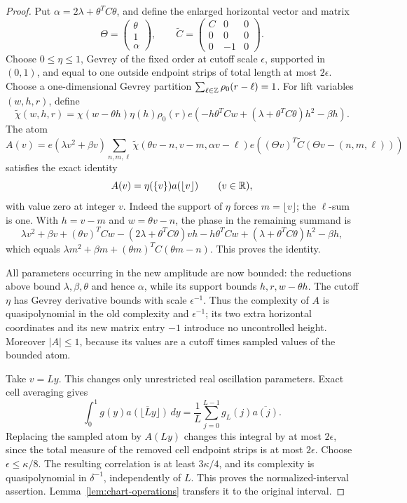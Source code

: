 \begin{proof}
Put \(\alpha=2\lambda+\theta^TC\theta\), and define the enlarged
horizontal vector and matrix
\[
 \Theta=\begin{pmatrix}\theta\\1\\\alpha\end{pmatrix},
 \qquad
 \widetilde C=
 \begin{pmatrix}
 C&0&0\\
 0&0&0\\
 0&-1&0
 \end{pmatrix}.
\]
Choose \(0\le\eta\le1\), Gevrey of the fixed order at cutoff scale
\(\epsilon\), supported in \((0,1)\), and equal to one outside
endpoint strips of total length at most \(2\epsilon\).
Choose a one-dimensional Gevrey partition
\(\sum_{\ell\in\mathbb Z}\rho_0(r-\ell)=1\).
For lift variables \((w,h,r)\), define
\[
 \widetilde\chi(w,h,r)=
   \chi(w-\theta h)\eta(h)\rho_0(r)
   e\!\left(-h\theta^TCw
             +(\lambda+\theta^TC\theta)h^2-\beta h\right).
\]
The atom
\[
 A(v)=e(\lambda v^2+\beta v)
       \sum_{n,m,\ell}
       \widetilde\chi(\theta v-n,v-m,\alpha v-\ell)
       e\!\left((\Theta v)^T\widetilde C
                        (\Theta v-(n,m,\ell))\right)
\]
satisfies the exact identity
\[
 A(v)=\eta(\{v\})a(\lfloor v\rfloor)
 \qquad(v\in\mathbb R),
\]
with value zero at integer \(v\).
Indeed the support of \(\eta\) forces \(m=\lfloor v\rfloor\);
the \(\ell\)-sum is one.  With \(h=v-m\) and \(w=\theta v-n\),
the phase in the remaining summand is
\[
 \lambda v^2+\beta v+(\theta v)^TCw
 -(2\lambda+\theta^TC\theta)vh-h\theta^TCw
       +(\lambda+\theta^TC\theta)h^2-\beta h,
\]
which equals
\(\lambda m^2+\beta m+(\theta m)^TC(\theta m-n)\).
This proves the identity.

All parameters occurring in the new amplitude are now bounded:
the reductions above bound \(\lambda,\beta,\theta\) and hence
\(\alpha\), while its support bounds \(h,r,w-\theta h\).
The cutoff \(\eta\) has Gevrey derivative bounds with scale
\(\epsilon^{-1}\).
Thus the complexity of \(A\) is quasipolynomial in the old complexity
and \(\epsilon^{-1}\); its two extra horizontal coordinates and its
new matrix entry \(-1\) introduce no uncontrolled height.
Moreover \(|A|\le1\), because its values are a cutoff times sampled
values of the bounded atom.

Take \(v=Ly\).  This changes only unrestricted real oscillation
parameters.  Exact cell averaging gives
\[
 \int_0^1 g(y)\overline{a(\lfloor Ly\rfloor)}\,dy
       =\frac1L\sum_{j=0}^{L-1}g_L(j)\overline{a(j)}.
\]
Replacing the sampled atom by \(A(Ly)\) changes this integral by at
most \(2\epsilon\), since the total measure of the removed cell
endpoint strips is at most \(2\epsilon\).
Choose \(\epsilon\le\kappa/8\).
The resulting correlation is at least \(3\kappa/4\), and its
complexity is quasipolynomial in \(\delta^{-1}\), independently of
\(L\).  This proves the normalized-interval assertion.
Lemma~\ref{lem:chart-operations} transfers it to the original interval.
\end{proof}

